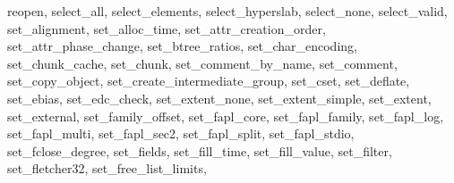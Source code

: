 {{        reopen,%
        select_all,%
        select_elements,%
        select_hyperslab,%
        select_none,%
        select_valid,%
        set_alignment,%
        set_alloc_time,%
        set_attr_creation_order,%
        set_attr_phase_change,%
        set_btree_ratios,%
        set_char_encoding,%
        set_chunk_cache,%
        set_chunk,%
        set_comment_by_name,%
        set_comment,%
        set_copy_object,%
        set_create_intermediate_group,%
        set_cset,%
        set_deflate,%
        set_ebias,%
        set_edc_check,%
        set_extent_none,%
        set_extent_simple,%
        set_extent,%
        set_external,%
        set_family_offset,%
        set_fapl_core,%
        set_fapl_family,%
        set_fapl_log,%
        set_fapl_multi,%
        set_fapl_sec2,%
        set_fapl_split,%
        set_fapl_stdio,%
        set_fclose_degree,%
        set_fields,%
        set_fill_time,%
        set_fill_value,%
        set_filter,%
        set_fletcher32,%
        set_free_list_limits,%
}}
